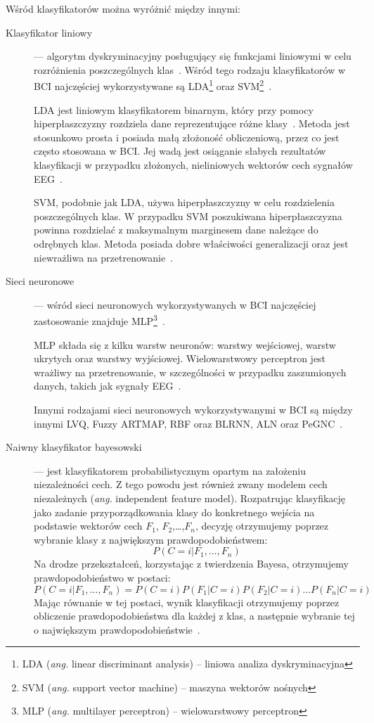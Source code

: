 \documentclass[skorowidz,skroty]{dyplomWEZUT}
\begin{document}
Wśród klasyfikatorów można wyróżnić między innymi:
\begin{description}
    \item [Klasyfikator liniowy] --- algorytm dyskryminacyjny posługujący się funkcjami liniowymi w celu rozróżnienia poszczególnych klas~\cite{eeg_classification}. Wśród tego rodzaju klasyfikatorów w BCI najczęściej wykorzystywane są LDA\footnote{LDA (\textit{ang.} linear discriminant analysis) -- liniowa analiza dyskryminacyjna} oraz SVM\footnote{SVM (\textit{ang.} support vector machine) -- maszyna wektorów nośnych}~\cite{bci_trends}.
    
    LDA jest liniowym klasyfikatorem binarnym, który przy pomocy hiperpłaszczyzny rozdziela dane reprezentujące różne klasy~\cite{eeg_classification}. Metoda jest stosunkowo prosta i posiada małą złożoność obliczeniową, przez co jest często stosowana w BCI. Jej wadą jest osiąganie słabych rezultatów klasyfikacji w przypadku złożonych, nieliniowych wektorów cech sygnałów EEG~\cite{bci_trends}. 

    SVM, podobnie jak LDA, używa hiperpłaszczyzny w celu rozdzielenia poszczególnych klas. W przypadku SVM poszukiwana hiperpłaszczyzna powinna rozdzielać z maksymalnym marginesem dane należące do odrębnych klas. Metoda posiada dobre właściwości generalizacji oraz jest niewrażliwa na przetrenowanie~\cite{eeg_features}.

    \item [Sieci neuronowe] --- wśród sieci neuronowych wykorzystywanych w BCI najczęściej zastosowanie znajduje MLP\footnote{MLP (\textit{ang.} multilayer perceptron) -- wielowarstwowy perceptron}~\cite{eeg_classification}.
    
    MLP składa się z kilku warstw neuronów: warstwy wejściowej, warstw ukrytych oraz warstwy wyjściowej. Wielowarstwowy perceptron jest wrażliwy na przetrenowanie, w szczególności w przypadku zaszumionych danych, takich jak sygnały EEG~\cite{bci_trends}.

    Innymi rodzajami sieci neuronowych wykorzystywanymi w BCI są między innymi LVQ, Fuzzy ARTMAP, RBF oraz BLRNN, ALN oraz PeGNC~\cite{eeg_classification}.
    
    \item [Naiwny klasyfikator bayesowski] --- jest klasyfikatorem probabilistycznym opartym na założeniu niezależności cech. Z tego powodu jest również zwany modelem cech niezależnych (\textit{ang.} independent feature model). Rozpatrując klasyfikację jako zadanie przyporządkowania klasy do konkretnego wejścia na podstawie wektorów cech $F_1$, $F_2$,\dots,$F_n$, decyzję otrzymujemy poprzez wybranie klasy z największym prawdopodobieństwem:
    $$P(C=i|F_1, \dots ,F_n)$$
    Na drodze przekształceń, korzystając z twierdzenia Bayesa, otrzymujemy prawdopodobieństwo w postaci:
    $$P(C=i|F_1, \dots ,F_n) = P(C=i)P(F_1|C=i)P(F_2|C=i) \dots P(F_n|C=i)$$
    Mając równanie w tej postaci, wynik klasyfikacji otrzymujemy poprzez obliczenie prawdopodobieństwa dla każdej z klas, a następnie wybranie tej o największym prawdopodobieństwie~\cite{bci_introduction}.    


\end{description}
\end{document}
